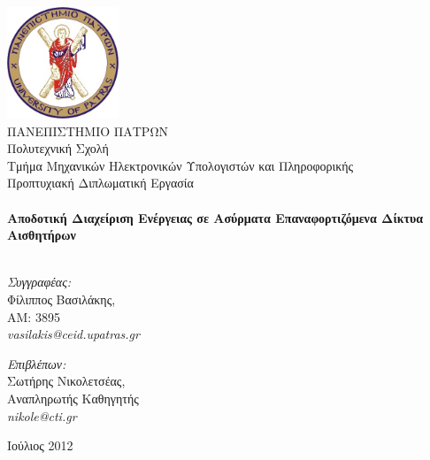 
\begin{titlingpage}
\begin{center}

\includegraphics[width=0.25\textwidth]{images/upatras_logo.jpg}\\[1cm]

\HUGE 	ΠΑΝΕΠΙΣΤΗΜΙΟ ΠΑΤΡΩΝ\\
\LARGE	Πολυτεχνική Σχολή\\
\Huge	Τμήμα Μηχανικών Ηλεκτρονικών Υπολογιστών και Πληροφορικής\\[1.5cm]

\LARGE Προπτυχιακή Διπλωματική Εργασία\\[0.1cm]


\HRule \\[0.4cm]
{ \HUGE \bfseries Αποδοτική Διαχείριση Ενέργειας σε Ασύρματα Επαναφορτιζόμενα Δίκτυα Αισθητήρων}\\[0.4cm]

\HRule \\[0.5cm]

\begin{minipage}{0.4\textwidth}
\begin{flushleft} \large
\textit{Συγγραφέας:}\\
Φίλιππος Βασιλάκης, \\AM: 3895\\ \textit{vasilakis@ceid.upatras.gr}
\end{flushleft}
\end{minipage}
\begin{minipage}{0.4\textwidth}
\begin{flushright} \large
\textit{Επιβλέπων:} \\
Σωτήρης Νικολετσέας, \\Αναπληρωτής Καθηγητής\\ \textit{nikole@cti.gr}
\end{flushright}
\end{minipage}

\vfill

{\large Ιούλιος 2012}

\end{center}

\end{titlingpage}
